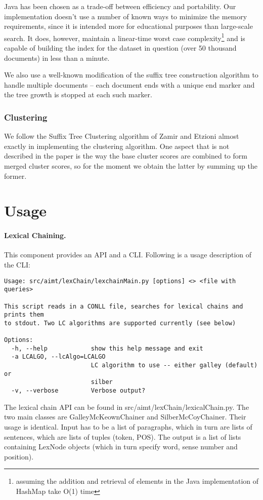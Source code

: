 \documentclass[11pt, a4paper, abstraction]{scrartcl}
\begin{document}
Java has been chosen as a trade-off between efficiency and portability. Our implementation doesn't use a number of known ways to minimize the memory requirements, since it is intended more for educational purposes than large-scale search. It does, however, maintain a linear-time worst case complexity\footnote{assuming the addition and retrieval of elements in the Java implementation of HashMap take O(1) time} and is capable of building the index for the dataset in question (over 50 thousand documents) in less than a minute.

We also use a well-known modification of the suffix tree construction algorithm to handle multiple documents -- each document ends with a unique end marker and the tree growth is stopped at each such marker.

\subsubsection{Clustering}
We follow the Suffix Tree Clustering algorithm of Zamir and Etzioni almost exactly in implementing the clustering algorithm. One aspect that is not described in the paper is the way the base cluster scores are combined to form merged cluster scores, so for the moment we obtain the latter by summing up the former.
 

\section{Usage}
\label{sec:usage}

\paragraph{Lexical Chaining.} 
This component provides an API and a CLI. Following is a usage description of the CLI: 

\begin{verbatim} 
Usage: src/aimt/lexChain/lexchainMain.py [options] <> <file with queries>

This script reads in a CONLL file, searches for lexical chains and prints them
to stdout. Two LC algorithms are supported currently (see below)

Options:
  -h, --help            show this help message and exit
  -a LCALGO, --lcAlgo=LCALGO
                        LC algorithm to use -- either galley (default) or
                        silber
  -v, --verbose         Verbose output?
\end{verbatim}
\noindent
The lexical chain API can be found in src/aimt/lexChain/lexicalChain.py. The two main classes are GalleyMcKeownChainer and SilberMcCoyChainer. Their usage is identical. Input has to be a list of paragraphs, which in turn are lists of sentences, which are lists of tuples (token, POS). The output is a list of lists containing LexNode objects (which in turn specify word, sense number and position).
\end{document}
